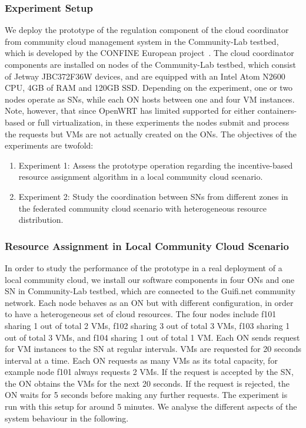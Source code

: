 

\subsubsection{Experiment Setup}
\label{sec:prototype-evaluation}

We deploy the prototype of the regulation component of the cloud coordinator from community cloud management system
in the Community-Lab testbed, which is developed by the CONFINE European project~\cite{Braem2013}. 
The cloud coordinator components are installed on nodes of the Community-Lab testbed, 
which consist of Jetway JBC372F36W devices, and are equipped with an Intel Atom N2600 CPU, 4GB of RAM and 120GB SSD. %
Depending on the experiment, one or two nodes operate as SNs, while each ON hosts between one and four VM instances. 
Note, however, that since OpenWRT has limited supported for either containers-based or full virtualization, 
in these experiments the nodes submit and process the requests but VMs are not actually created on the ONs.
The objectives of the experiments are twofold: 

\begin{enumerate}
    \item Experiment 1: Assess the prototype operation regarding the incentive-based resource assignment algorithm in a local community cloud scenario.
    \item Experiment 2: Study the coordination between SNs from different zones in the federated community cloud scenario with heterogeneous resource distribution.
\end{enumerate}


\subsubsection{Resource Assignment in Local Community Cloud Scenario}
\label{sec:resource-assign-local}

In order to study the performance of the prototype in a real deployment of a local community cloud, 
we install our software components in four ONs and one SN in Community-Lab testbed, 
which are connected to the Guifi.net community network. 
Each node behaves as an ON but with different configuration, in order to have a heterogeneous set of cloud resources. 
The four nodes include
f101 sharing 1 out of total 2 VMs, 
f102 sharing 3 out of total 3 VMs, 
f103 sharing 1 out of total 3 VMs, and
f104 sharing 1 out of total 1 VM.
Each ON sends request for VM instances to the SN at regular intervals. 
VMs are requested for 20 seconds interval at a time. 
Each ON requests as many VMs as its total capacity, for example node f101 always requests 2 VMs.
If the request is accepted by the SN, the ON obtains the VMs for the next 20 seconds. 
If the request is rejected, the ON waits for 5 seconds before making any further requests.
The experiment is run with this setup for around 5 minutes. 
We analyse the different aspects of the system behaviour in the following.


